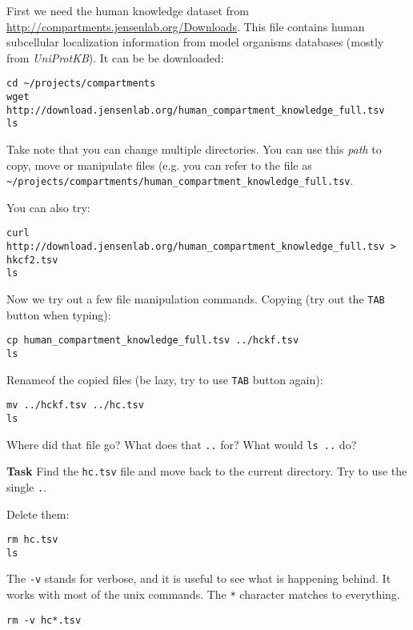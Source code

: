 \documentclass{article}\usepackage[]{graphicx}\usepackage[usenames,dvipsnames]{color}
\begin{document}
First we need the human knowledge dataset from \href{http://compartments.jensenlab.org/Downloads}{http://compartments.jensenlab.org/Downloads}. This file contains human subcellular localization information from model organisms databases (mostly from \emph{UniProtKB}). It can be be downloaded:

\begin{verbatim}
cd ~/projects/compartments
wget http://download.jensenlab.org/human_compartment_knowledge_full.tsv
ls
\end{verbatim}

Take note that you can change multiple directories. You can use this \emph{path} to copy, move or manipulate files (e.g. you can refer to the file as \verb+~/projects/compartments/human_compartment_knowledge_full.tsv+. 

You can also try:
\begin{verbatim}
curl http://download.jensenlab.org/human_compartment_knowledge_full.tsv > hkcf2.tsv
ls
\end{verbatim}

Now we try out a few file manipulation commands. Copying (try out the \verb+TAB+ button when typing):

\begin{verbatim}
cp human_compartment_knowledge_full.tsv ../hckf.tsv
ls
\end{verbatim}

Renameof the copied files (be lazy, try to use \verb+TAB+ button again):

\begin{verbatim}
mv ../hckf.tsv ../hc.tsv
ls
\end{verbatim}

Where did that file go? What does that \verb+..+ for? What would \verb+ls ..+ do?

\textbf{Task} Find the \verb+hc.tsv+ file and move back to the current directory. Try to use the single \verb+.+.

Delete them:

\begin{verbatim}
rm hc.tsv
ls
\end{verbatim}

The \verb+-v+ stands for verbose, and it is useful to see what is happening behind. It works with most of the unix commands. The \verb+*+ character matches to everything.

\begin{verbatim}
rm -v hc*.tsv
\end{verbatim}
\end{document}
